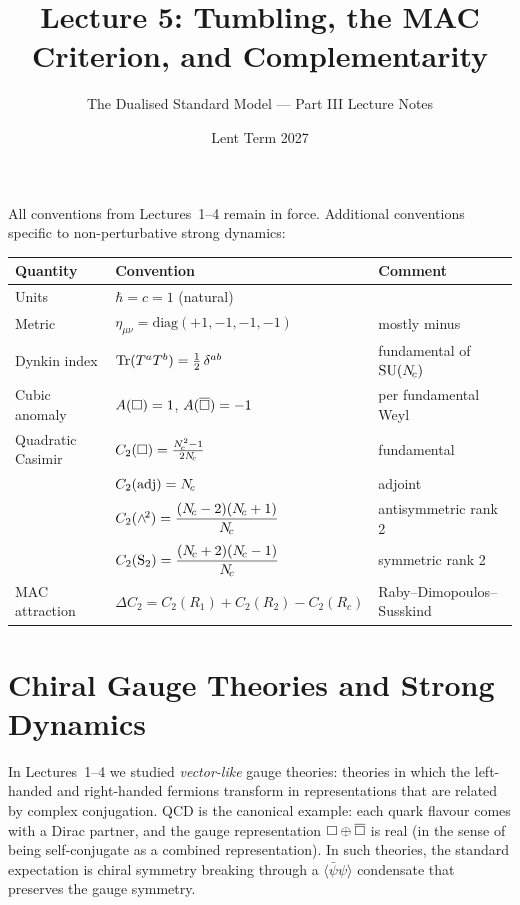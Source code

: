 \documentclass[11pt,a4paper]{article}
\title{\textbf{Lecture 5: Tumbling, the MAC Criterion, and Complementarity}}
\author{The Dualised Standard Model --- Part III Lecture Notes}
\date{Lent Term 2027}
\begin{document}
\maketitle

\tableofcontents
\newpage


\begin{conventionbox}[title={Conventions for Lecture 5}]
All conventions from Lectures~1--4 remain in force.  Additional
conventions specific to non-perturbative strong dynamics:

\renewcommand{\arraystretch}{1.3}
\begin{tabular}{@{}l l l@{}}
\toprule
\textbf{Quantity} & \textbf{Convention} & \textbf{Comment} \\
\midrule
Units & $\hbar = c = 1$ (natural) & \\
Metric & $\eta_{\mu\nu} = \mathrm{diag}(+1,-1,-1,-1)$ & mostly minus \\
Dynkin index & $\mathrm{Tr}(T^a T^b) = \tfrac{1}{2}\, \delta^{ab}$ & fundamental of $\mathrm{SU}(N_{\!c})$ \\
Cubic anomaly & $A(\square) = 1$, $A(\overline{\square}) = -1$ & per fundamental Weyl \\
Quadratic Casimir & $C_2(\square) = \frac{N_{\!c}^2 - 1}{2N_{\!c}}$ & fundamental \\
 & $C_2(\mathrm{adj}) = N_{\!c}$ & adjoint \\
 & $C_2(\wedge^{\!2}) = \dfrac{(N_{\!c}-2)(N_{\!c}+1)}{N_{\!c}}$ & antisymmetric rank 2 \\[4pt]
 & $C_2(\mathrm{S}_2) = \dfrac{(N_{\!c}+2)(N_{\!c}-1)}{N_{\!c}}$ & symmetric rank 2 \\[4pt]
MAC attraction & $\Delta C_2 = C_2(R_1) + C_2(R_2) - C_2(R_c)$ &
  Raby--Dimopoulos--Susskind \\
\bottomrule
\end{tabular}
\end{conventionbox}


\section{Chiral Gauge Theories and Strong Dynamics}
\label{sec:chiral}

In Lectures~1--4 we studied \emph{vector-like} gauge theories: theories
in which the left-handed and right-handed fermions transform in
representations that are related by complex conjugation.  QCD is the
canonical example: each quark flavour comes with a Dirac partner, and
the gauge representation $\square \oplus \overline{\square}$ is real (in the sense
of being self-conjugate as a combined representation).  In such theories,
the standard expectation is chiral symmetry breaking through a
$\langle \bar{\psi}\psi \rangle$ condensate that preserves the gauge
symmetry.
\end{document}
